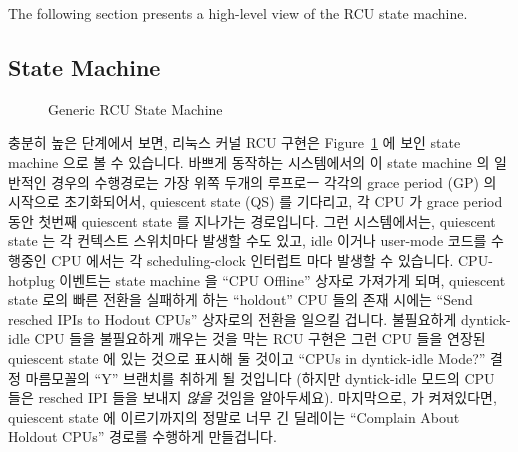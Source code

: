 The following section presents a high-level view of the RCU state machine.
\fi

\subsection{State Machine}
\label{app:rcuimpl:rcutree:State Machine}

\begin{figure}[htbp]
\centering
{}
\caption{Generic RCU State Machine}
\label{fig:app:rcuimpl:rcutree:Generic RCU State Machine}
\end{figure}

충분히 높은 단계에서 보면, 리눅스 커널 RCU 구현은
Figure~\ref{fig:app:rcuimpl:rcutree:Generic RCU State Machine} 에 보인 state
machine 으로 볼 수 있습니다.
바쁘게 동작하는 시스템에서의 이 state machine 의 일반적인 경우의 수행경로는
가장 위쪽 두개의 루프로ㅡ 각각의 grace period (GP) 의 시작으로 초기화되어서,
quiescent state (QS) 를 기다리고, 각 CPU 가 grace period 동안 첫번째 quiescent
state 를 지나가는 경로입니다.
그런 시스템에서는, quiescent state 는 각 컨텍스트 스위치마다 발생할 수도 있고,
idle 이거나 user-mode 코드를 수행중인 CPU 에서는 각 scheduling-clock 인터럽트
마다 발생할 수 있습니다.
CPU-hotplug 이벤트는 state machine 을 ``CPU Offline'' 상자로 가져가게 되며,
quiescent state 로의 빠른 전환을 실패하게 하는 ``holdout'' CPU 들의 존재 시에는
``Send resched IPIs to Hodout CPUs'' 상자로의 전환을 일으킬 겁니다.
불필요하게 dyntick-idle CPU 들을 불필요하게 깨우는 것을 막는 RCU 구현은 그런
CPU 들을 연장된 quiescent state 에 있는 것으로 표시해 둘 것이고 ``CPUs in
dyntick-idle Mode?'' 결정 마름모꼴의 ``Y'' 브랜치를 취하게 될 것입니다 (하지만
dyntick-idle 모드의 CPU 들은 resched IPI 들을 보내지 \emph{않을} 것임을
알아두세요).
마지막으로,  가 켜져있다면, quiescent state
에 이르기까지의 정말로 너무 긴 딜레이는 ``Complain About Holdout CPUs'' 경로를
수행하게 만들겁니다.
\iffalse

